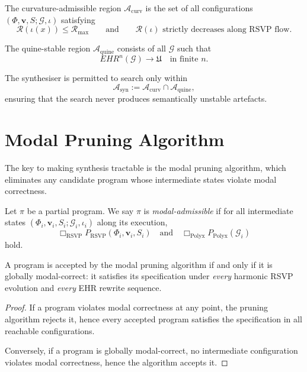 \begin{definition}
The curvature-admissible region $\mathcal{A}_{\mathrm{curv}}$ is the set of all
configurations $(\Phi,\mathbf{v},S;\mathcal{G},\iota)$ satisfying
\[
\mathcal{R}(\iota(x)) \le \mathcal{R}_{\max}
\qquad\text{and}\qquad
\mathcal{R}(\iota) \text{ strictly decreases along RSVP flow}.
\]
\end{definition}

\begin{definition}
The quine-stable region $\mathcal{A}_{\mathrm{quine}}$ consists of all
$\mathcal{G}$ such that
\[
EHR^n(\mathcal{G}) \to \mathfrak{U}
\quad\text{in finite $n$}.
\]
\end{definition}

The synthesiser is permitted to search only within
\[
\mathcal{A}_{\mathrm{syn}} := \mathcal{A}_{\mathrm{curv}}
\cap \mathcal{A}_{\mathrm{quine}},
\]
ensuring that the search never produces semantically unstable artefacts.


\section{Modal Pruning Algorithm}
\label{sec:51:pruning}

The key to making synthesis tractable is the modal pruning algorithm, which
eliminates any candidate program whose intermediate states violate modal
correctness.

\begin{definition}
Let $\pi$ be a partial program.  
We say $\pi$ is \emph{modal-admissible} if for all intermediate states
$(\Phi_i,\mathbf{v}_i,S_i;\mathcal{G}_i,\iota_i)$ along its execution,
\[
\Box_{\mathrm{RSVP}} P_{\mathrm{RSVP}}(\Phi_i,\mathbf{v}_i,S_i)
\quad\text{and}\quad
\Box_{\mathrm{Polyx}} P_{\mathrm{Polyx}}(\mathcal{G}_i)
\]
hold.
\end{definition}

\begin{theorem}
\label{thm:modal-pruning}
A program is accepted by the modal pruning algorithm if and only if it is
globally modal-correct: it satisfies its specification under \emph{every}
harmonic RSVP evolution and \emph{every} EHR rewrite sequence.
\end{theorem}

\begin{proof}
If a program violates modal correctness at any point, the pruning algorithm
rejects it, hence every accepted program satisfies the specification in all
reachable configurations.

Conversely, if a program is globally modal-correct, no intermediate configuration
violates modal correctness, hence the algorithm accepts it.  
\end{proof}


